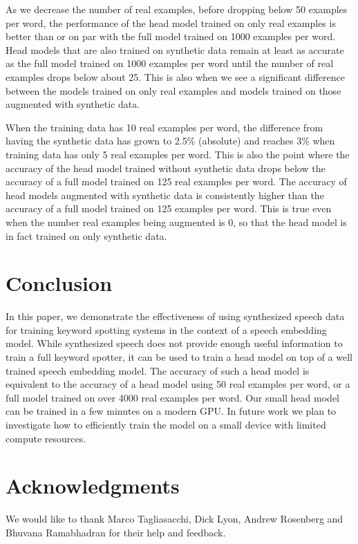 \documentclass{article}
\begin{document}
As we decrease the number of real examples, before dropping below 50 examples per word, the performance of the head model trained on only real examples is better than or on par with the full model trained on 1000 examples per word. Head models that are also trained on synthetic data remain at least as accurate as the full model trained on 1000 examples per word until the number of real examples drops below about 25. This is also when we see a significant difference between the models trained on only real examples and models trained on those augmented with synthetic data.

When the training data has 10 real examples per word, the difference from having the synthetic data has grown to 2.5\% (absolute) and reaches 3\% when training data has only 5 real examples per word. This is also the point where the accuracy of the head model trained without synthetic data drops below the accuracy of a full model trained on 125 real examples per word. The accuracy of head models augmented with synthetic data is consistently higher than the accuracy of a full model trained on 125 examples per word. This is true even when the number real examples being augmented is 0, so that the head model is in fact trained on only synthetic data.




















\vspace{-0.2cm}

\section{Conclusion}
\label{sec:conclusion}

In this paper, we demonstrate the effectiveness of using synthesized speech data for training keyword spotting systems in the context of a speech embedding model.
While synthesized speech does not provide enough useful information to train a full keyword spotter, it can be used to train a head model on top of a well trained speech embedding model. The accuracy of such a head model is equivalent to the accuracy of a head model using 50 real examples per word, or a full model trained on over 4000 real examples per word. Our small head model can be trained in a few minutes on a modern GPU. In future work we plan to investigate how to efficiently train the model on a small device with limited compute resources.
\vspace{-0.2cm}

\section{Acknowledgments}
We would like to thank Marco Tagliasacchi, Dick Lyon, Andrew Rosenberg and Bhuvana Ramabhadran for their help and feedback.


\vfill\pagebreak

\label{sec:refs}

\balance

\printbibliography
\end{document}
